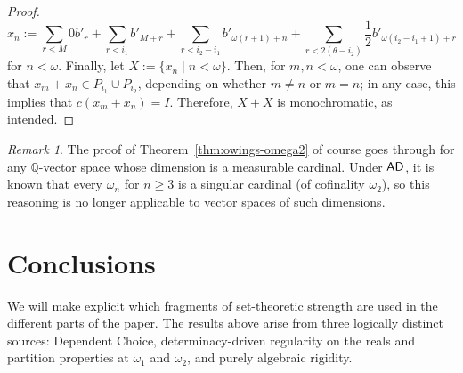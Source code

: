 \documentclass[10pt,a4paper]{amsart}
\theoremstyle{definition}
\newcommand{\ad}{\mathnormal{\mathsf{AD}}}
\theoremstyle{remark}
\newtheorem{remark}[theorem]{Remark}
\numberwithin{equation}{section}
\begin{document}
\begin{proof}
        \begin{equation*}
        x_{n}:=\sum_{r<M}0b'_{r}+\sum_{r<i_{1}}b'_{M+r}+\sum_{r<i_{2}-i_{1}} b'_{\omega(r+1)+n}+\sum_{r<2(\theta-i_{2})}\frac{1}{2}b'_{\omega(i_{2}-i_{1}+1)+r}
        \end{equation*}
        for $n<\omega$. Finally, let $X:=\{x_{n}\mid n<\omega\}$. Then, for $m, n<\omega$, one can observe that $x_{m}+x_{n}\in P_{i_{1}}\cup P_{i_2}$, depending on whether $m\neq n$ or $m=n$; in any case, this implies that $c(x_m+x_n)=I$. Therefore, $X + X$ is monochromatic, as intended.
\end{proof}


\begin{remark}
    The proof of Theorem~\ref{thm:owings-omega2} of course goes through for any $\mathbb Q$-vector space whose dimension is a measurable cardinal. Under $\ad$, it is known that every $\omega_n$ for $n\geq 3$ is a singular cardinal (of cofinality $\omega_2$), so this reasoning is no longer applicable to vector spaces of such dimensions.
\end{remark}

\section{Conclusions}\label{sec:choice-ad}

We will make explicit which fragments of set-theoretic strength are used in the different parts of the paper. 
The results above arise from three logically distinct sources: Dependent Choice, determinacy-driven regularity on the reals and partition properties at $\omega_1$ and $\omega_2$, and purely algebraic rigidity.
\end{document}
